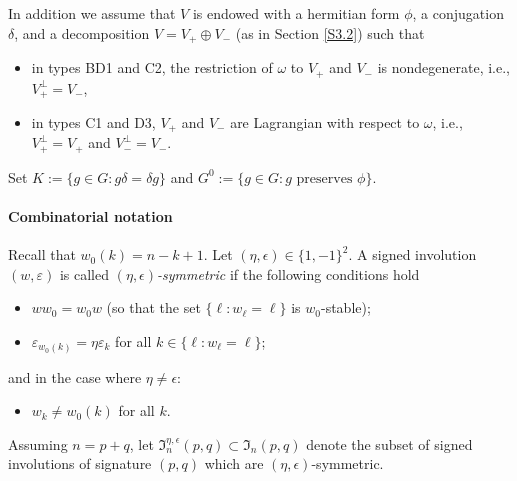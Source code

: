 \documentclass{amsart}
\theoremstyle{definition}
\begin{document}
In addition we assume that $V$ is endowed with a hermitian form $\phi$, a conjugation $\delta$, and a decomposition $V=V_+\oplus V_-$ (as in Section \ref{S3.2}) such that
\begin{itemize}
\item in types BD1 and C2, the restriction of $\omega$ to $V_+$ and $V_-$ is nondegenerate, i.e., $V_+^\perp=V_-$, 
\item in types C1 and D3, $V_+$ and $V_-$ are Lagrangian with respect to $\omega$, i.e., $V_+^\perp=V_+$ and $V_-^\perp=V_-$.
\end{itemize}
Set $K:=\{g\in G:g\delta=\delta g\}$ and $G^0:=\{g\in G:\mbox{$g$ preserves $\phi$}\}$.

\medskip

\paragraph{\bf Combinatorial notation}
Recall that $w_0(k)=n-k+1$. 
Let $(\eta,\epsilon)\in\{1,-1\}^2$.
A signed involution $(w,\varepsilon)$ is called {\em $(\eta,\epsilon)$-symmetric} if the following conditions hold
\begin{itemize}
\item[(i)] $ww_0=w_0w$ (so that the set $\{\ell:w_\ell=\ell\}$ is $w_0$-stable);
\item[(ii)] $\varepsilon_{w_0(k)}=\eta \varepsilon_k$ for all $k\in\{\ell:w_\ell=\ell\}$;
\end{itemize}
and in the case where $\eta\not=\epsilon$:
\begin{itemize}
\item[(iii)]$w_k\not=w_0(k)$ for all $k$.
\end{itemize}
Assuming $n=p+q$, let $\mathfrak{I}_n^{\eta,\epsilon}(p,q)\subset\mathfrak{I}_n(p,q)$ denote the subset of signed involutions of signature $(p,q)$ which are $(\eta,\epsilon)$-symmetric.
\end{document}
